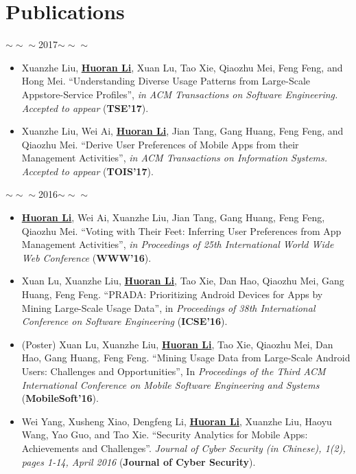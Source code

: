 \documentclass[a4paper,10pt]{article}
\begin{document}
\section{Publications}

\begin{center}
\begin{large}
$\sim\sim\sim$2017$\sim\sim\sim$
\end{large}
\end{center}

\begin{itemize}
	\item Xuanzhe Liu, \textbf{\underline{Huoran Li}}, Xuan Lu, Tao Xie, Qiaozhu Mei, Feng Feng, and Hong Mei. ``Understanding Diverse Usage Patterns from Large-Scale Appstore-Service Profiles'', \textit{in ACM Transactions on Software Engineering. Accepted to appear}  (\textbf{TSE'17}).
	\item Xuanzhe Liu, Wei Ai, \textbf{\underline{Huoran Li}}, Jian Tang, Gang Huang, Feng Feng, and Qiaozhu Mei. ``Derive User Preferences of Mobile Apps from their Management Activities'', \textit{in ACM Transactions on Information Systems. Accepted to appear}  (\textbf{TOIS'17}).
\end{itemize}

\begin{center}
\begin{large}
$\sim\sim\sim$2016$\sim\sim\sim$
\end{large}
\end{center}

\begin{itemize}
	\item \textbf{\underline{Huoran Li}}, Wei Ai, Xuanzhe Liu, Jian Tang, Gang Huang, Feng Feng, Qiaozhu Mei. ``Voting with Their Feet: Inferring User Preferences from App Management Activities'', \textit{in Proceedings of 25th International World Wide Web Conference} (\textbf{WWW'16}).
	\item Xuan Lu, Xuanzhe Liu, \textbf{\underline{Huoran Li}}, Tao Xie, Dan Hao, Qiaozhu Mei, Gang Huang, Feng Feng. ``PRADA: Prioritizing Android Devices for Apps by Mining Large-Scale Usage Data'', in \textit{Proceedings of 38th International Conference on Software Engineering} (\textbf{ICSE'16}).
	\item (Poster) Xuan Lu, Xuanzhe Liu, \textbf{\underline{Huoran Li}}, Tao Xie, Qiaozhu Mei, Dan Hao, Gang Huang, Feng Feng. ``Mining Usage Data from Large-Scale Android Users: Challenges and Opportunities'', In \textit{Proceedings of the Third ACM International Conference on Mobile Software Engineering and Systems} (\textbf{MobileSoft'16}).
	\item Wei Yang, Xusheng Xiao, Dengfeng Li, \textbf{\underline{Huoran Li}}, Xuanzhe Liu, Haoyu Wang, Yao Guo, and Tao Xie. ``Security Analytics for Mobile Apps: Achievements and Challenges''. \textit{Journal of Cyber Security (in Chinese), 1(2), pages 1-14, April 2016} (\textbf{Journal of Cyber Security}).
\end{itemize}
\end{document}
